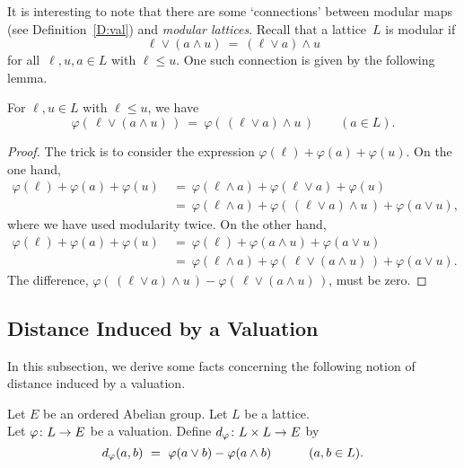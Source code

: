 \documentclass[main.tex]{subfiles}
\begin{document}
It is interesting to note that
there are some `connections'
between
modular maps (see Definition~\ref{D:val})
and \emph{modular lattices}.
Recall that a lattice~$L$ is modular if
\begin{equation*}
\ell \vee (a \wedge u) \ =\ (\ell \vee a) \wedge u
\end{equation*}
for all~$\ell,u,a \in L$ with $\ell \leq u$.
One such connection is given by the following lemma.
%
%
\begin{lem}
\label{L:modular-map-modular}
For $\ell,u\in L$ with $\ell\leq u$, we have
\begin{equation}
\label{eq:modular-map}
\varphi(\,\ell \vee (a \wedge u)\,) 
\ =\ 
\varphi(\,(\ell\vee a)\wedge u\,)
\qquad (a\in L).
\end{equation}
\end{lem}
\begin{proof}
The trick is to consider the expression 
$\varphi(\ell) + \varphi(a) + \varphi(u)$.
On the one hand,
\begin{align*}
\varphi(\ell) + \varphi(a) + \varphi(u)
\ &=\ \varphi(\ell\wedge a) + \varphi(\ell \vee a) + \varphi(u) \\
\ &=\ \varphi(\ell \wedge a)
      + \varphi(\,(\ell\vee a)\wedge u\,)
      + \varphi(a\vee u),
\end{align*}
where we have used modularity twice.
On the other hand,
\begin{align*}
\varphi(\ell) + \varphi(a) + \varphi(u)
\ &=\ \varphi(\ell) + \varphi(a\wedge u) + \varphi(a \vee u) \\
\ &=\ \varphi(\ell \wedge a)
      + \varphi(\,\ell\vee (a\wedge u)\,)
      + \varphi(a\vee u).
\end{align*}
The difference,
$\varphi(\,(\ell\vee a)\wedge u\,)
- \varphi(\,\ell\vee (a\wedge u)\,)$,
must be zero.
\end{proof}

%
%
%
%
\subsection{Distance Induced by a Valuation}
\label{SS:vals_d}
In this subsection,
we derive some facts 
concerning the following notion
of distance induced by a valuation.
\begin{dfn}
\label{D:d}
Let $E$ be an ordered Abelian group.
Let $L$ be a lattice.\\
Let $\varphi\colon L \rightarrow E$ be a valuation.
Define $d_{\smash{\varphi}}\colon L\times L \rightarrow E$ by
\begin{equation*}
\ld\varphi(a,b)\ =\  \varphi(a\vee b) - \varphi(a \wedge b)
\qquad\quad(a,b\in L).
\end{equation*}
\end{dfn}
\end{document}
